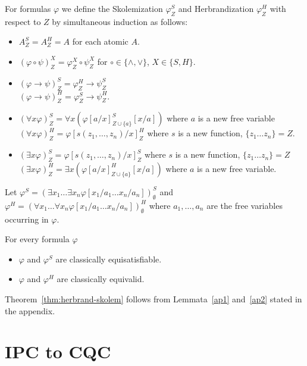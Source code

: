 \documentclass[a4paper,UKenglish,cleveref, autoref, thm-restate]{lipics-v2021}
\begin{document}
\begin{definition}
	For formulas $\varphi$ we define the Skolemization $\varphi^S_Z$ and Herbrandization $\varphi^H_Z$ with respect to $Z$ by simultaneous induction as follows:
	\begin{itemize}
		\item $A^S_Z = A^H_Z = A$ for each atomic $A$.
		\item $(\varphi\circ\psi)^X_Z = \varphi^X_Z\circ\psi^X_Z$ for $\circ\in\{\wedge, \vee\}$, $X\in\{S, H\}$.
		\item $(\varphi\to\psi)^S_Z = \varphi^H_Z\to \psi^S_Z$\\$(\varphi\to\psi)^H_Z = \varphi^S_Z\to\psi^H_Z$.
		\item $(\forall x\varphi)^S_Z = \forall x(\varphi[a/x]^S_{Z\cup\{a\}}[x/a])$ where $a$ is a new free variable\\$(\forall x\varphi)^H_Z = \varphi[s(z_1,\dots,z_n)/x]^H_Z$ where $s$ is a new function, $\{z_1\dots z_n\} = Z$.
		\item $(\exists x\varphi)^S_Z = \varphi[s(z_1,\dots,z_n)/x]^S_Z$ where $s$ is a new function, $\{z_1\dots z_n\} = Z$\\$(\exists x\varphi)^H_Z = \exists x(\varphi[a/x]^H_{Z\cup\{a\}}[x/a])$ where $a$ is a new free variable.
	\end{itemize}
	Let $\varphi^S = (\exists x_1\dots\exists x_n \varphi[x_1/a_1\dots x_n/a_n])^S_\emptyset$ and $\varphi^H = (\forall x_1\dots\forall x_n \varphi[x_1/a_1\dots x_n/a_n])^H_\emptyset$ where $a_1,\dots,a_n$ are the free variables occurring in $\varphi$.
\end{definition}

\begin{theorem}
\label{thm:herbrand-skolem}
For every formula $\varphi$
	\begin{itemize}
		\item $\varphi$ and $\varphi^S$ are classically equisatisfiable.
		\item $\varphi$ and $\varphi^H$ are classically equivalid.
	\end{itemize}
\end{theorem}

Theorem~\ref{thm:herbrand-skolem} follows from Lemmata~\ref{ap1} and~\ref{ap2} stated in the appendix.


\section{IPC to CQC}
\end{document}
